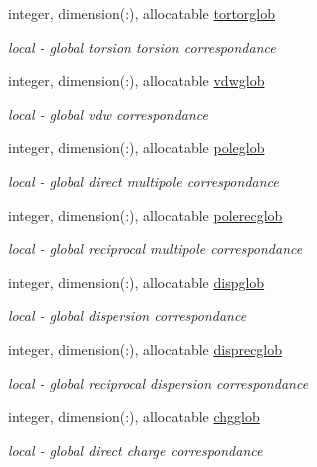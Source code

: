 \begin{DoxyCompactItemize}
integer, dimension(\-:), allocatable \hyperlink{classatmlst_aef68f98ee043765bf13b795a34506911}{tortorglob}
\begin{DoxyCompactList}\small\item\em local -\/ global torsion torsion correspondance \end{DoxyCompactList}\item 
integer, dimension(\-:), allocatable \hyperlink{classatmlst_aa81ad6da528fd26372d8173d7c5ff4a7}{vdwglob}
\begin{DoxyCompactList}\small\item\em local -\/ global vdw correspondance \end{DoxyCompactList}\item 
integer, dimension(\-:), allocatable \hyperlink{classatmlst_a03688f66de3d996cffdac3d71f2d184b}{poleglob}
\begin{DoxyCompactList}\small\item\em local -\/ global direct multipole correspondance \end{DoxyCompactList}\item 
integer, dimension(\-:), allocatable \hyperlink{classatmlst_a6aa66bdf6ac0461505594cd330c53eba}{polerecglob}
\begin{DoxyCompactList}\small\item\em local -\/ global reciprocal multipole correspondance \end{DoxyCompactList}\item 
integer, dimension(\-:), allocatable \hyperlink{classatmlst_a342dc8a9cffba913ea2e51e8669730e7}{dispglob}
\begin{DoxyCompactList}\small\item\em local -\/ global dispersion correspondance \end{DoxyCompactList}\item 
integer, dimension(\-:), allocatable \hyperlink{classatmlst_accb07e02e31c6d75821dfd39b36b3f55}{disprecglob}
\begin{DoxyCompactList}\small\item\em local -\/ global reciprocal dispersion correspondance \end{DoxyCompactList}\item 
integer, dimension(\-:), allocatable \hyperlink{classatmlst_aeed78d19132d1dee9d0d1f85bf32d6ce}{chgglob}
\begin{DoxyCompactList}\small\item\em local -\/ global direct charge correspondance \end{DoxyCompactList}\item 

\end{DoxyCompactItemize}
